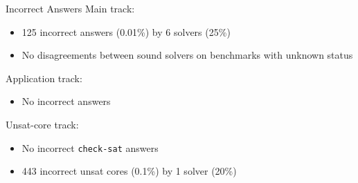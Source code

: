 \documentclass{beamer}
\begin{document}

\begin{frame}{Incorrect Answers}
  Main track:
  \begin{itemize}
  \item 125 incorrect answers (0.01\%) by 6 solvers (25\%)
  \item No disagreements between sound solvers on benchmarks with
    unknown status
  \end{itemize}

  \bigskip

  Application track:
  \begin{itemize}
  \item No incorrect answers
  \end{itemize}

  \bigskip

  Unsat-core track:
  \begin{itemize}
  \item No incorrect \texttt{check-sat} answers
  \item 443 incorrect unsat cores (0.1\%) by 1 solver (20\%)
  \end{itemize}
\end{frame}

\end{document}
